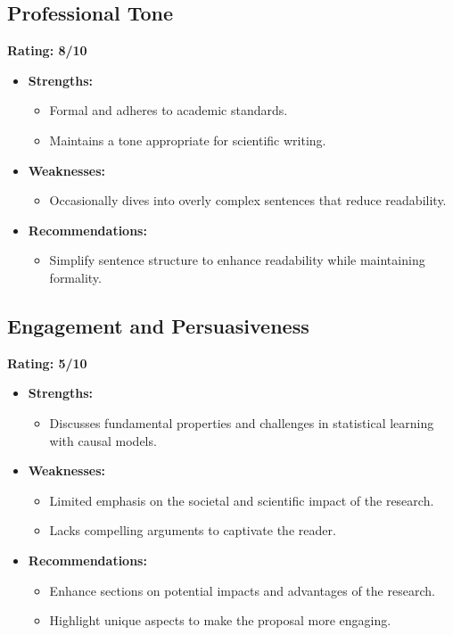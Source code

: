 \documentclass{article}
\begin{document}
\subsection{Professional Tone}
\textbf{Rating: 8/10}

\begin{itemize}
    \item \textbf{Strengths:}
    \begin{itemize}
        \item Formal and adheres to academic standards.
        \item Maintains a tone appropriate for scientific writing.
    \end{itemize}
    \item \textbf{Weaknesses:}
    \begin{itemize}
        \item Occasionally dives into overly complex sentences that reduce readability.
    \end{itemize}
    \item \textbf{Recommendations:}
    \begin{itemize}
        \item Simplify sentence structure to enhance readability while maintaining formality.
    \end{itemize}
\end{itemize}

\subsection{Engagement and Persuasiveness}
\textbf{Rating: 5/10}

\begin{itemize}
    \item \textbf{Strengths:}
    \begin{itemize}
        \item Discusses fundamental properties and challenges in statistical learning with causal models.
    \end{itemize}
    \item \textbf{Weaknesses:}
    \begin{itemize}
        \item Limited emphasis on the societal and scientific impact of the research.
        \item Lacks compelling arguments to captivate the reader.
    \end{itemize}
    \item \textbf{Recommendations:}
    \begin{itemize}
        \item Enhance sections on potential impacts and advantages of the research.
        \item Highlight unique aspects to make the proposal more engaging.
    \end{itemize}
\end{itemize}
\end{document}

